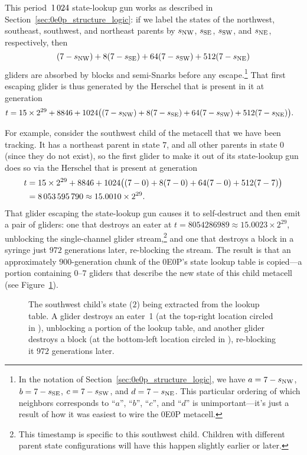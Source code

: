 This period~$1{\,}024$ state-lookup gun works as described in Section~\ref{sec:0e0p_structure_logic}: if we label the states of the northwest, southeast, southwest, and northeast parents by $s_{\textup{NW}}$, $s_{\textup{SE}}$, $s_{\textup{SW}}$, and $s_{\textup{NE}}$, respectively, then
\[
	(7-s_{\textup{NW}}) + 8(7-s_{\textup{SE}}) + 64(7-s_{\textup{SW}}) + 512(7-s_{\textup{NE}})
\]
gliders are absorbed by blocks and semi-Snarks before any escape.\footnote{In the notation of Section~\ref{sec:0e0p_structure_logic}, we have $a = 7-s_{\textup{NW}}$, $b = 7-s_{\textup{SE}}$, $c = 7-s_{\textup{SW}}$, and $d = 7-s_{\textup{NE}}$. This particular ordering of which neighbors corresponds to ``$a$'', ``$b$'', ``$c$'', and ``$d$'' is unimportant---it's just a result of how it was easiest to wire the 0E0P metacell.} That first escaping glider is thus generated by the Herschel that is present in it at generation
\begin{align*}
	t & = 15 \times 2^{29} + 8846 + 1024\big((7-s_{\textup{NW}}) + 8(7-s_{\textup{SE}}) + 64(7-s_{\textup{SW}}) + 512(7-s_{\textup{NE}})\big).
\end{align*}

For example, consider the southwest child of the metacell that we have been tracking. It has a northeast parent in state $7$, and all other parents in state $0$ (since they do not exist), so the first glider to make it out of its state-lookup gun does so via the Herschel that is present at generation
\begin{align*}
	t & = 15 \times 2^{29} + 8846 + 1024\big((7-0) + 8(7-0) + 64(7-0) + 512(7-7)\big) \\
	& = 8{\,}053{\,}595{\,}790 \approx 15.0010 \times 2^{29}.
\end{align*}
That glider escaping the state-lookup gun causes it to self-destruct and then emit a pair of gliders: one that destroys an eater at $t = 8054286989 \approx 15.0023 \times 2^{29}$, unblocking the single-channel glider stream,\footnote{This timestamp is specific to this southwest child. Children with different parent state configurations will have this happen slightly earlier or later.} and one that destroys a block in a syringe just $972$ generations later, re-blocking the stream. The result is that an approximately $900$-generation chunk of the 0E0P's state lookup table is copied---a portion containing $0$--$7$ gliders that describe the new state of this child metacell (see Figure~\ref{fig:0e0p_timeline_8054286989}).

\begin{figure}[!htb]
	\centering
	\caption{The southwest child's state ($2$) being extracted from the lookup table. A glider destroys an eater~1 (at the top-right location circled in ), unblocking a portion of the lookup table, and another glider destroys a block (at the bottom-left location circled in ), re-blocking it $972$ generations later.}
	\label{fig:0e0p_timeline_8054286989}
\end{figure}

